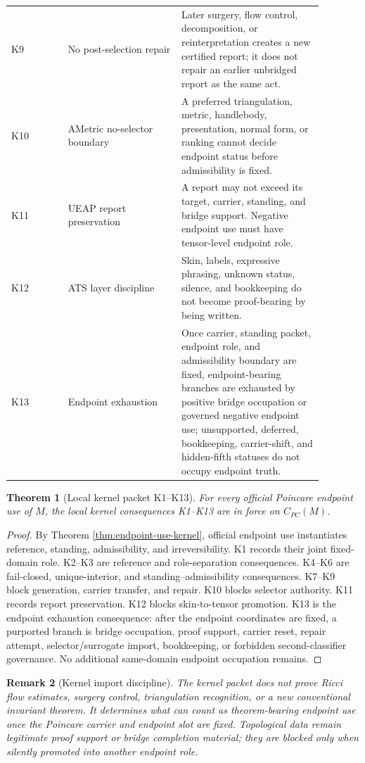 \documentclass[11pt]{article}
\newtheorem{theorem}{Theorem}[section]
\newtheorem{remark}[theorem]{Remark}
\newcommand{\CarrierPC}{C_{PC}}
\begin{document}
\begin{longtable}{L{0.16\linewidth}L{0.32\linewidth}L{0.40\linewidth}}
K9 & No post-selection repair & Later surgery, flow control, decomposition, or reinterpretation creates a new certified report; it does not repair an earlier unbridged report as the same act.\\
K10 & AMetric no-selector boundary & A preferred triangulation, metric, handlebody, presentation, normal form, or ranking cannot decide endpoint status before admissibility is fixed.\\
K11 & UEAP report preservation & A report may not exceed its target, carrier, standing, and bridge support. Negative endpoint use must have tensor-level endpoint role.\\
K12 & ATS layer discipline & Skin, labels, expressive phrasing, unknown status, silence, and bookkeeping do not become proof-bearing by being written.\\
K13 & Endpoint exhaustion & Once carrier, standing packet, endpoint role, and admissibility boundary are fixed, endpoint-bearing branches are exhausted by positive bridge occupation or governed negative endpoint use; unsupported, deferred, bookkeeping, carrier-shift, and hidden-fifth statuses do not occupy endpoint truth.\\
\bottomrule
\end{longtable}

\begin{theorem}[Local kernel packet K1--K13]\label{thm:local-kernel-packet}
For every official Poincare endpoint use of \(M\), the local kernel consequences K1--K13 are in force on \(\CarrierPC(M)\).
\end{theorem}
\begin{proof}
By Theorem \ref{thm:endpoint-use-kernel}, official endpoint use instantiates reference, standing, admissibility, and irreversibility. K1 records their joint fixed-domain role. K2--K3 are reference and role-separation consequences. K4--K6 are fail-closed, unique-interior, and standing--admissibility consequences. K7--K9 block generation, carrier transfer, and repair. K10 blocks selector authority. K11 records report preservation. K12 blocks skin-to-tensor promotion. K13 is the endpoint exhaustion consequence: after the endpoint coordinates are fixed, a purported branch is bridge occupation, proof support, carrier reset, repair attempt, selector/surrogate import, bookkeeping, or forbidden second-classifier governance. No additional same-domain endpoint occupation remains.
\end{proof}

\begin{remark}[Kernel import discipline]
The kernel packet does not prove Ricci flow estimates, surgery control, triangulation recognition, or a new conventional invariant theorem. It determines what can count as theorem-bearing endpoint use once the Poincare carrier and endpoint slot are fixed. Topological data remain legitimate proof support or bridge completion material; they are blocked only when silently promoted into another endpoint role.
\end{remark}
\end{document}
